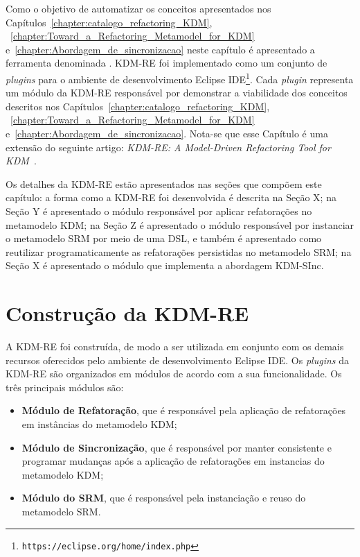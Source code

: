 Como o objetivo de automatizar os conceitos apresentados nos Capítulos~\ref{chapter:catalogo_refactoring_KDM}, ~\ref{chapter:Toward_a_Refactoring_Metamodel_for_KDM} e~\ref{chapter:Abordagem_de_sincronizacao} neste capítulo é apresentado a ferramenta denominada . KDM-RE foi implementado como um conjunto de \textit{plugins} para o ambiente de desenvolvimento Eclipse IDE\footnote{\texttt{https://eclipse.org/home/index.php}}. Cada \textit{plugin} representa um módulo da KDM-RE responsável por demonstrar a viabilidade dos conceitos descritos nos Capítulos~\ref{chapter:catalogo_refactoring_KDM}, ~\ref{chapter:Toward_a_Refactoring_Metamodel_for_KDM} e~\ref{chapter:Abordagem_de_sincronizacao}.  Nota-se que esse Capítulo é uma extensão do seguinte artigo: \textit{KDM-RE: A Model-Driven Refactoring Tool for KDM}~\cite{durelli_VEM_ferramenta}.

Os detalhes da KDM-RE estão apresentados nas seções que compõem este capítulo: a forma como a KDM-RE foi desenvolvida é descrita na Seção X; na Seção Y é apresentado o módulo responsável por aplicar refatorações no metamodelo KDM; na Seção Z é apresentado o módulo responsável por instanciar o metamodelo SRM por meio de uma DSL, e também é apresentado como reutilizar programaticamente as refatorações persistidas no metamodelo SRM; na Seção X é apresentado o módulo que implementa a abordagem KDM-SInc.



\section{Construção da KDM-RE}

A KDM-RE foi construída, de modo a ser utilizada em conjunto com os demais recursos oferecidos pelo ambiente de desenvolvimento Eclipse IDE. Os \textit{plugins} da KDM-RE são organizados em módulos de acordo com a sua funcionalidade. Os três principais módulos são:

\begin{itemize}
\item \textbf{Módulo de Refatoração}, que é responsável pela aplicação de refatorações em instâncias do metamodelo KDM;
\item \textbf{Módulo de Sincronização}, que é responsável por manter consistente e programar mudanças após a aplicação de refatorações em instancias do metamodelo KDM;
\item \textbf{Módulo do SRM}, que é responsável pela instanciação e reuso do metamodelo SRM.

\end{itemize}

